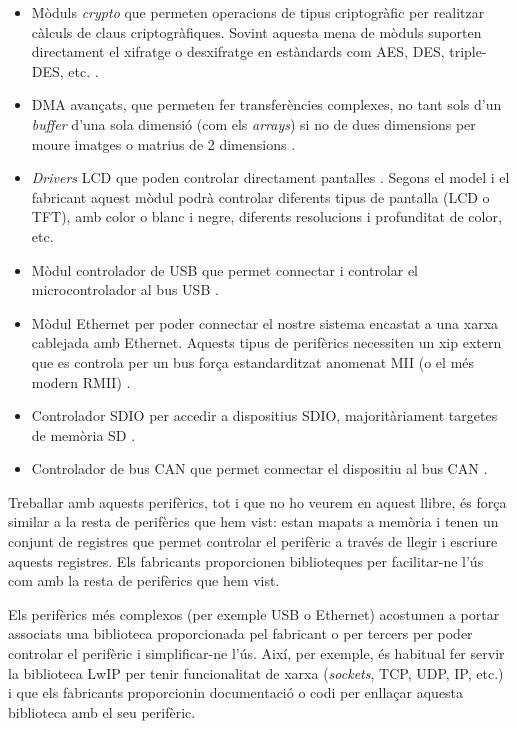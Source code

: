 \begin{itemize}
 \item Mòduls {\em crypto} que permeten operacions de tipus criptogràfic per realitzar càlculs de claus criptogràfiques. Sovint aquesta mena de mòduls suporten directament el xifratge o desxifratge en estàndards com AES, DES, triple-DES, etc. \cite[720]{STM32F4RM}\cite[772]{STM32F4RM}\cite[453]{EFM32TGRM}.
 \item \gls{DMA} avançats, que permeten fer transferències complexes, no tant sols d'un {\em buffer} d'una sola dimensió (com els {\em arrays}) si no de dues dimensions per moure imatges o matrius de 2 dimensions \cite[339]{STM32F4RM}.
 \item {\em Drivers} \gls{LCD} que poden controlar directament pantalles \cite[480]{STM32F4RM}\cite[490]{EFM32TGRM}. Segons el model i el fabricant aquest mòdul podrà controlar diferents tipus de pantalla (LCD o TFT), amb color o blanc i negre, diferents resolucions i profunditat de color, etc.
 \item Mòdul controlador de USB que permet connectar i controlar el microcontrolador al bus USB \cite[965]{STM32F4RM}\cite[1446]{EFM32GG11RM}.
 \item Mòdul Ethernet per poder connectar el nostre sistema encastat a una xarxa cablejada amb Ethernet. Aquests tipus de perifèrics necessiten un xip extern que es controla per un bus força estandarditzat anomenat \gls{MII} (o el més modern RMII) \cite[1121]{STM32F4RM}\cite[1729]{EFM32GG11RM} \cite{wiki:rmi}.
 \item Controlador \gls{SDIO} per accedir a dispositius SDIO, majoritàriament targetes de memòria SD \cite[1019]{STM32F4RM}\cite[1670]{EFM32GG11RM}.
 \item Controlador de bus \gls{CAN} que permet connectar el dispositiu al bus CAN \cite[1076]{STM32F4RM}\cite[1899]{EFM32GG11RM} \cite{wiki:can}.
\end{itemize}

Treballar amb aquests perifèrics, tot i que no ho veurem en aquest llibre, és força similar a la resta de perifèrics que hem vist: estan mapats a memòria i tenen un conjunt de registres que permet controlar el perifèric a través de llegir i escriure aquests registres. Els fabricants proporcionen biblioteques per facilitar-ne l'ús com amb la resta de perifèrics que hem vist.

Els perifèrics més complexos (per exemple USB o Ethernet) acostumen a portar associats una biblioteca proporcionada pel fabricant o per tercers per poder controlar el perifèric i simplificar-ne l'ús. Així, per exemple, és habitual fer servir la biblioteca LwIP per tenir funcionalitat de xarxa ({\em sockets}, TCP, UDP, IP, etc.) \cite{lwip}\cite{wiki:lwip} i que els fabricants proporcionin documentació o codi per enllaçar aquesta biblioteca amb el seu perifèric.


